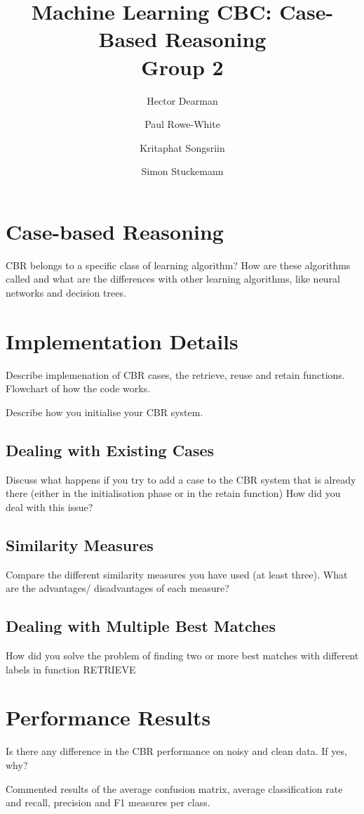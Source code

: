 \documentclass[10pt,a4paper]{article}
\author{Hector Dearman \and Paul Rowe-White \and Kritaphat Songsriin \and Simon Stuckemann}
\title{Machine Learning CBC: Case-Based Reasoning\\Group 2}
\begin{document}
\maketitle

\section{Case-based Reasoning}
CBR belongs to a specific class of learning algorithm? How are these algorithms called and what are the differences with other learning algorithms, like neural networks and decision trees.

\section{Implementation Details}
Describe implemenation of CBR cases, the retrieve, reuse and retain functions. Flowchart of how the code works.

Describe how you initialise your CBR system.

\subsection{Dealing with Existing Cases}
Discuss what happens if you try to add a case to the CBR system that is already there (either in the initialisation phase or in the retain function) How did you deal with this issue?

\subsection{Similarity Measures}
Compare the different similarity measures you have used (at least three). What are the advantages/ disadvantages of each measure?

\subsection{Dealing with Multiple Best Matches}
How did you solve the problem of finding two or more best matches with different labels in function RETRIEVE


\section{Performance Results}

Is there any difference in the CBR performance on noisy and clean data. If yes, why?

Commented results of the average confusion matrix, average classification rate and recall, precision and F1 measures per class.
\end{document}
